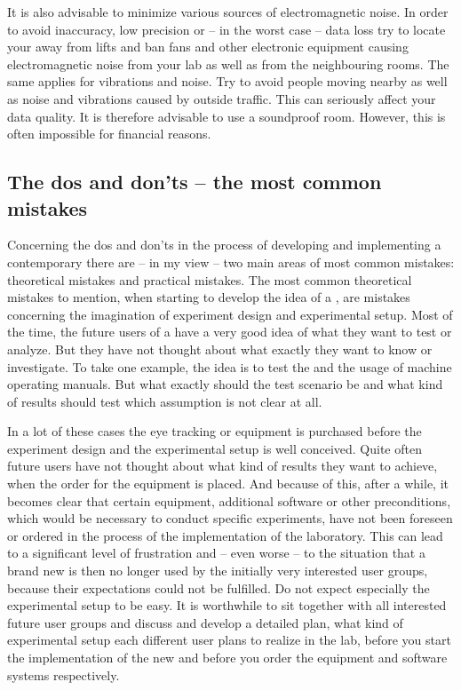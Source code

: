 \documentclass[output=paper]{langsci/langscibook}
\begin{document}
It is also advisable to minimize various sources of electromagnetic noise. In order to avoid inaccuracy, low precision or -- in the worst case -- data loss try to locate your  away from lifts and ban fans and other electronic equipment causing electromagnetic noise from your  lab as well as from the neighbouring rooms. The same applies for vibrations and noise. Try to avoid people moving nearby as well as noise and vibrations caused by outside traffic. This can seriously affect your data quality. It is therefore advisable to use a soundproof room. However, this is often impossible for financial reasons.


\subsection{The dos and don'ts -- the most common mistakes }

Concerning the dos and don'ts in the process of developing and implementing a contemporary  there are -- in my view -- two main areas of most common mistakes: theoretical mistakes and practical mistakes. The most common theoretical mistakes to mention, when starting to develop the idea of a , are mistakes concerning the imagination of experiment design and experimental setup. Most of the time, the future users of a  have a very good idea of what they want to test or analyze. But they have not thought about what exactly they want to know or investigate. To take one example, the idea is to test the  and the usage of machine operating manuals. But what exactly should the test scenario be and what kind of results should test which assumption is not clear at all. 


In a lot of these cases the eye tracking or  equipment is purchased before the experiment design and the experimental setup is well conceived. Quite often future users have not thought about what kind of results they want to achieve, when the order for the equipment is placed. And because of this, after a while, it becomes clear that certain equipment, additional software or other preconditions, which would be necessary to conduct specific experiments, have not been foreseen or ordered in the process of the implementation of the laboratory. This can lead to a significant level of frustration and -- even worse -- to the situation that a brand new  is then no longer used by the initially very interested user groups, because their expectations could not be fulfilled. Do not expect especially the experimental setup to be easy. It is worthwhile to sit together with all interested future user groups and discuss and develop a detailed plan, what kind of experimental setup each different user plans to realize in the lab, before you start the implementation of the new  and before you order the equipment and software systems respectively.
\end{document}
